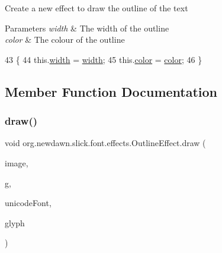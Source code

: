 Create a new effect to draw the outline of the text


\begin{DoxyParams}{Parameters}
{\em width} & The width of the outline \\
\hline
{\em color} & The colour of the outline \\
\hline
\end{DoxyParams}

\begin{DoxyCode}
43                                                  \{
44         this.\mbox{\hyperlink{classorg_1_1newdawn_1_1slick_1_1font_1_1effects_1_1_outline_effect_aad96e33c4fb5804e7423df04e1cc1936}{width}} = \mbox{\hyperlink{classorg_1_1newdawn_1_1slick_1_1font_1_1effects_1_1_outline_effect_aad96e33c4fb5804e7423df04e1cc1936}{width}};
45         this.\mbox{\hyperlink{classorg_1_1newdawn_1_1slick_1_1font_1_1effects_1_1_outline_effect_a00160c4c005cb659d45c135a2798005f}{color}} = \mbox{\hyperlink{classorg_1_1newdawn_1_1slick_1_1font_1_1effects_1_1_outline_effect_a00160c4c005cb659d45c135a2798005f}{color}};
46     \}
\end{DoxyCode}


\subsection{Member Function Documentation}
\mbox{\label{classorg_1_1newdawn_1_1slick_1_1font_1_1effects_1_1_outline_effect_ae8ec8a0b355f211c3d97a328016f5772}} 
\subsubsection{\texorpdfstring{draw()}{draw()}}
{\footnotesize\ttfamily void org.\+newdawn.\+slick.\+font.\+effects.\+Outline\+Effect.\+draw (\begin{DoxyParamCaption}\item[{Buffered\+Image}]{image,  }\item[{Graphics2D}]{g,  }\item[{\mbox{\hyperlink{classorg_1_1newdawn_1_1slick_1_1_unicode_font}{Unicode\+Font}}}]{unicode\+Font,  }\item[{\mbox{\hyperlink{classorg_1_1newdawn_1_1slick_1_1font_1_1_glyph}{Glyph}}}]{glyph }\end{DoxyParamCaption})\hspace{0.3cm}{\ttfamily [inline]}}

